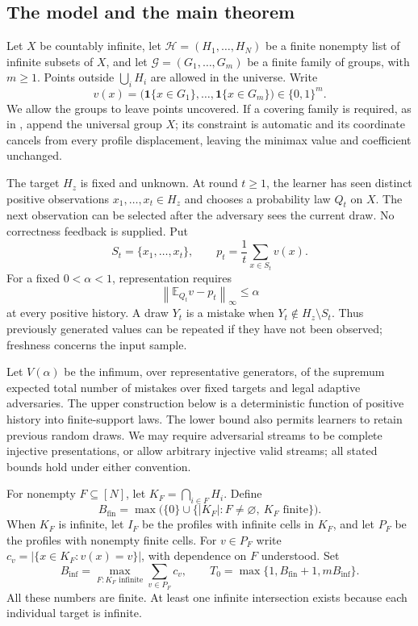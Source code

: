 \subsection{The model and the main theorem}
Let $X$ be countably infinite, let $\mathcal H=(H_1,\ldots,H_N)$ be a finite nonempty list of infinite subsets of $X$, and let $\mathcal G=(G_1,\ldots,G_m)$ be a finite family of groups, with $m\ge1$. Points outside $\bigcup_iH_i$ are allowed in the universe. Write
\[
v(x)=\bigl(\mathbf 1\{x\in G_1\},\ldots,\mathbf 1\{x\in G_m\}\bigr)\in\{0,1\}^m.
\]
We allow the groups to leave points uncovered. If a covering family is required, as in \citet{P09}, append the universal group $X$; its constraint is automatic and its coordinate cancels from every profile displacement, leaving the minimax value and coefficient unchanged.

The target $H_z$ is fixed and unknown. At round $t\ge1$, the learner has seen distinct positive observations $x_1,\ldots,x_t\in H_z$ and chooses a probability law $Q_t$ on $X$. The next observation can be selected after the adversary sees the current draw. No correctness feedback is supplied. Put
\[
S_t=\{x_1,\ldots,x_t\},\qquad p_t=\frac1t\sum_{x\in S_t}v(x).
\]
For a fixed $0<\alpha<1$, representation requires
\begin{equation}\label{gm:eq:representation}
\left\|\mathbb E_{Q_t}v-p_t\right\|_\infty\le\alpha
\end{equation}
at every positive history. A draw $Y_t$ is a mistake when $Y_t\notin H_z\setminus S_t$. Thus previously generated values can be repeated if they have not been observed; freshness concerns the input sample.

Let $V(\alpha)$ be the infimum, over representative generators, of the supremum expected total number of mistakes over fixed targets and legal adaptive adversaries. The upper construction below is a deterministic function of positive history into finite-support laws. The lower bound also permits learners to retain previous random draws. We may require adversarial streams to be complete injective presentations, or allow arbitrary injective valid streams; all stated bounds hold under either convention.

For nonempty $F\subseteq[N]$, let $K_F=\bigcap_{i\in F}H_i$. Define
\[
B_{\mathrm{fin}}=\max\bigl(\{0\}\cup
\{|K_F|:F\ne\varnothing,\ K_F\text{ finite}\}\bigr).
\]
When $K_F$ is infinite, let $I_F$ be the profiles with infinite cells in $K_F$, and let $P_F$ be the profiles with nonempty finite cells. For $v\in P_F$ write $c_v=|\{x\in K_F:v(x)=v\}|$, with dependence on $F$ understood. Set
\[
B_{\mathrm{inf}}=\max_{F:K_F\text{ infinite}}\sum_{v\in P_F}c_v,
\qquad T_0=\max\{1,B_{\mathrm{fin}}+1,mB_{\mathrm{inf}}\}.
\]
All these numbers are finite. At least one infinite intersection exists because each individual target is infinite.

